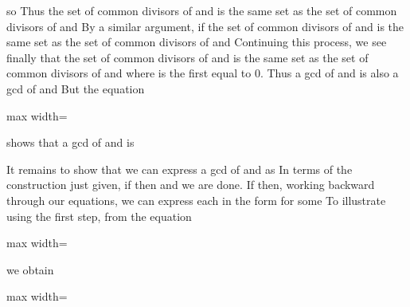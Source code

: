 \documentclass[11pt,oneside]{article}
\begin{document}
\begin{BookBody}
\noindent so  Thus the set of common divisors of  and  is the same set as the set of common divisors of  and  By a similar argument, if  the set of common divisors of  and  is the same set as the set of common divisors of  and  Continuing this process, we see finally that the set of common divisors of  and  is the same set as the set of common divisors of  and  where  is the first  equal to 0. Thus a gcd of  and  is also a gcd of  and  But the equation

\begin{center}\begin{adjustbox}{max width=\linewidth}\end{adjustbox}\end{center}

\noindent shows that a gcd of  and  is 

It remains to show that we can express a gcd  of  and  as  In terms of the construction just given, if  then  and we are done. If  then, working backward through our equations, we can express each  in the form  for some  To illustrate using the first step, from the equation

\begin{center}\begin{adjustbox}{max width=\linewidth}\end{adjustbox}\end{center}

\noindent we obtain

\begin{center}\begin{adjustbox}{max width=\linewidth}\end{adjustbox}\end{center}


\end{BookBody}
\end{document}
